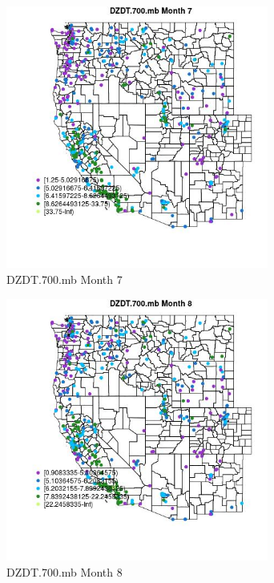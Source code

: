 \begin{figure} 
\centering  
\includegraphics[width=0.77\textwidth]{Code_Outputs/ML_input_report_ML_input_PM25_Step5_part_d_de_duplicated_aves_ML_input_MapObsMo7DZDT700mb.jpg} 
\caption{\label{fig:ML_input_report_ML_input_PM25_Step5_part_d_de_duplicated_aves_ML_inputMapObsMo7DZDT700mb}DZDT.700.mb Month 7} 
\end{figure} 
 

\begin{figure} 
\centering  
\includegraphics[width=0.77\textwidth]{Code_Outputs/ML_input_report_ML_input_PM25_Step5_part_d_de_duplicated_aves_ML_input_MapObsMo8DZDT700mb.jpg} 
\caption{\label{fig:ML_input_report_ML_input_PM25_Step5_part_d_de_duplicated_aves_ML_inputMapObsMo8DZDT700mb}DZDT.700.mb Month 8} 
\end{figure} 
 

